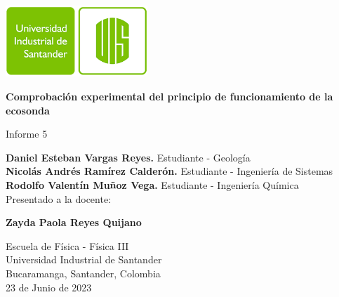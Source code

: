 \begin{titlepage}
    \begin{center}
        \includegraphics[width=0.4\textwidth]{../general-images/uis-logo.png}
        
        \vspace{0.5cm}
        \LARGE
        \textbf{Comprobación experimental del principio de funcionamiento de la ecosonda}
        
        \vspace{0.5cm}
        \large
        Informe 5
        
        \vfill
        
        \textbf{Daniel Esteban Vargas Reyes.} Estudiante - Geología\\
        \textbf{Nicolás Andrés Ramírez Calderón.} Estudiante - Ingeniería de Sistemas\\ 
        \textbf{Rodolfo Valentín Muñoz Vega.} Estudiante - Ingeniería Química\\

        \vspace{1.0cm}
        Presentado a la docente:
        
        \textbf{Zayda Paola Reyes Quijano}
        
        \vfill
        
        Escuela de Física - Física III\\
        Universidad Industrial de Santander\\
        Bucaramanga, Santander, Colombia\\
        23 de Junio de 2023
    \end{center}
\end{titlepage}
